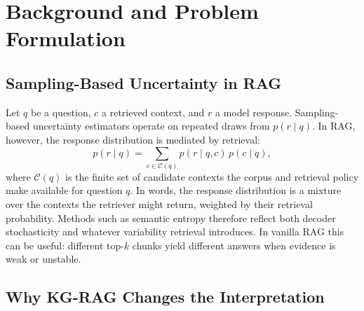 \section{Background and Problem Formulation}
\label{sec:background}

\subsection{Sampling-Based Uncertainty in RAG}
\label{sec:uq_background}

Let $q$ be a question, $c$ a retrieved context, and $r$ a model response.
Sampling-based uncertainty estimators operate on repeated draws from
$p(r \mid q)$.
In RAG, however, the response distribution is mediated by retrieval:
\begin{equation}
  p(r \mid q)
  = \sum_{c \in \mathcal{C}(q)} p(r \mid q, c)\, p(c \mid q),
  \label{eq:marginal}
\end{equation}
where $\mathcal{C}(q)$ is the finite set of candidate contexts the corpus and
retrieval policy make available for question $q$.
In words, the response distribution is a mixture over the contexts the
retriever might return, weighted by their retrieval probability.
Methods such as semantic entropy therefore reflect both decoder stochasticity
and whatever variability retrieval introduces.
In vanilla RAG this can be useful: different top-$k$ chunks yield different
answers when evidence is weak or unstable.

\subsection{Why KG-RAG Changes the Interpretation}
\label{sec:determinism}

